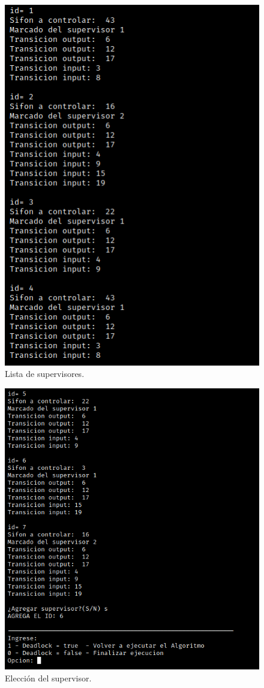 \begin{figure} [H]
    \centering
    \includegraphics[scale=0.7]{Figures/apendiceB/Py-POPN2.png}
    \caption{Lista de supervisores.}
    \label{fig:b-popn2}
\end{figure}

\begin{figure} [H]
    \centering
    \includegraphics[scale=0.65]{Figures/apendiceB/Py-POPN3.png}
    \caption{Elección del supervisor.}
    \label{fig:b-popn3}
\end{figure}

